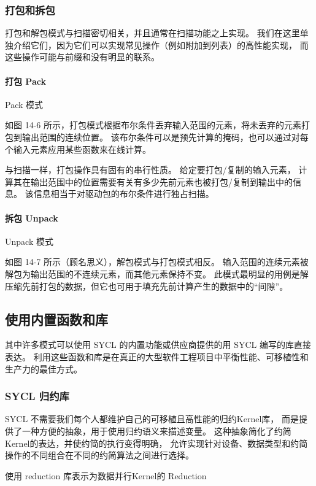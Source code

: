 \subsubsection{打包和拆包}
打包和解包模式与扫描密切相关，并且通常在扫描功能之上实现。 
我们在这里单独介绍它们，因为它们可以实现常见操作（例如附加到列表）的高性能实现，
而这些操作可能与前缀和没有明显的联系。

\paragraph{打包 Pack}

{\color{red} Pack 模式}

如图 14-6 所示，打包模式根据布尔条件丢弃输入范围的元素，将未丢弃的元素打包到输出范围的连续位置。 
该布尔条件可以是预先计算的掩码，也可以通过对每个输入元素应用某些函数来在线计算。

与扫描一样，打包操作具有固有的串行性质。 给定要打包/复制的输入元素，
计算其在输出范围中的位置需要有关有多少先前元素也被打包/复制到输出中的信息。 
该信息相当于对驱动包的布尔条件进行独占扫描。

\paragraph{拆包 Unpack}

{\color{red} Unpack 模式}

如图 14-7 所示（顾名思义），解包模式与打包模式相反。 
输入范围的连续元素被解包为输出范围的不连续元素，而其他元素保持不变。 
此模式最明显的用例是解压缩先前打包的数据，但它也可用于填充先前计算产生的数据中的“间隙”。

\subsection{使用内置函数和库}
其中许多模式可以使用 SYCL 的内置功能或供应商提供的用 SYCL 编写的库直接表达。 
利用这些函数和库是在真正的大型软件工程项目中平衡性能、可移植性和生产力的最佳方式。

\subsubsection{SYCL 归约库}
SYCL 不需要我们每个人都维护自己的可移植且高性能的归约Kernel库，
而是提供了一种方便的抽象，用于使用归约语义来描述变量。 
这种抽象简化了约简Kernel的表达，并使约简的执行变得明确，
允许实现针对设备、数据类型和约简操作的不同组合在不同的约简算法之间进行选择。

{\color{red} 使用 reduction 库表示为数据并行Kernel的 Reduction}

